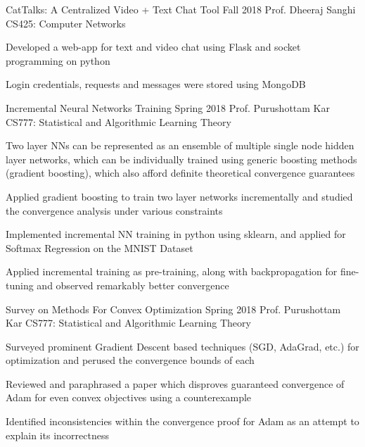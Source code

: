 \begin{cventries}
	\cventry
	{CatTalks: A Centralized Video + Text Chat Tool}
	{}
	{Fall 2018}
	{Prof. Dheeraj Sanghi}
	{CS425: Computer Networks}
	{
		\begin{cvitems}
		\item Developed a web-app for text and video chat using Flask and socket programming on python
		\item Login credentials, requests and messages were stored using MongoDB
		\end{cvitems}
	}

	\cventry
	{Incremental Neural Networks Training}
	{}
	{Spring 2018}
	{Prof. Purushottam Kar}
	{CS777: Statistical and Algorithmic Learning Theory}
	{
		\begin{cvitems}
		\item Two layer NNs can be represented as an ensemble of multiple single node hidden layer networks, which can be individually trained using generic boosting methods (gradient boosting), which also afford definite theoretical convergence guarantees
		\item Applied gradient boosting to train two layer networks incrementally and studied the convergence analysis under various constraints
		\item Implemented incremental NN training in python using sklearn, and applied for Softmax Regression on the MNIST Dataset
		\item Applied incremental training as pre-training, along with backpropagation for fine-tuning and observed remarkably better convergence
		\end{cvitems}
	}

	\cventry
	{Survey on Methods For Convex Optimization}
	{}
	{Spring 2018}
	{Prof. Purushottam Kar}
	{CS777: Statistical and Algorithmic Learning Theory}
	{
		\begin{cvitems}
		\item Surveyed prominent Gradient Descent based techniques (SGD, AdaGrad, etc.) for optimization and perused the convergence bounds of each
		\item Reviewed and paraphrased a paper which disproves guaranteed convergence of Adam for even convex objectives using a counterexample
		\item Identified inconsistencies within the convergence proof for Adam as an attempt to explain its incorrectness
		\end{cvitems}
	}


\end{cventries}
